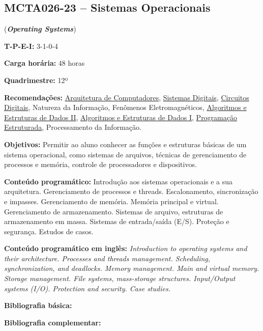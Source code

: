 \documentclass[class=article, crop=false]{standalone}
\begin{document}
\subsection*{MCTA026-23 -- Sistemas Operacionais}
\label{disc:so}

(\textbf{\textit{Operating Systems}})

\begin{center}
\begin{minipage}{0.85\textwidth}
    \textbf{T-P-E-I:} 3-1-0-4
    
    \textbf{Carga horária:} 48 horas
    
    \textbf{Quadrimestre:} 12º
    
    \textbf{Recomendações:} 
    \hyperref[disc:arq]{Arquitetura de Computadores},
    \hyperref[disc:sist_dig]{Sistemas Digitais},
    \hyperref[disc:circ_dig]{Circuitos Digitais},
    Natureza da Informação, 
    Fenômenos Eletromagnéticos,
    \hyperref[disc:aedII]{Algoritmos e Estruturas de Dados II},
    \hyperref[disc:aedI]{Algoritmos e Estruturas de Dados I},
    \hyperref[disc:pe]{Programação Estruturada}, 
    Processamento da Informação.
\end{minipage}
\end{center}

\textbf{Objetivos:}
Permitir ao aluno conhecer as funções e estruturas básicas de um sistema
operacional, como sistemas de arquivos, técnicas de gerenciamento de processos
e memória, controle de processadores e dispositivos. 

\textbf{Conteúdo programático:}
Introdução aos sistemas operacionais e a sua arquitetura. 
Gerenciamento de processos e threads.
Escalonamento, sincronização e impasses.
Gerenciamento de memória. 
Memória principal e virtual. 
Gerenciamento de armazenamento. 
Sistemas de arquivo, estruturas de armazenamento em massa. 
Sistemas de entrada/saída (E/S). 
Proteção e segurança. 
Estudos de casos.

\textbf{Conteúdo programático em inglês:}
\textit{Introduction to operating systems and their architecture. 
Processes and threads management. 
Scheduling, synchronization, and deadlocks. 
Memory management. 
Main and virtual memory. 
Storage management. 
File systems, mass-storage structures. 
Input/Output systems (I/O). 
Protection and security. 
Case studies.}


\newrefsection
\textbf{Bibliografia básica:}
\nocite{2010-silberschatz, 2016-tanenbaum, 2005-deitel}
\printbibliography

\newrefsection
\textbf{Bibliografia complementar:}
\nocite{2018-flynn, 2009-stallings, 2005-bovet, 2008-tanenbaum, 2004-oliveira}
\printbibliography
\end{document}
